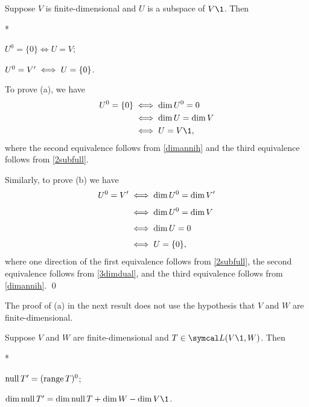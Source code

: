 {Suppose $V$ is finite-dimensional and $U$ is a subspace of $V\1$. Then
\begin{subtheorem}*
\item
$U^0 = \{0\} \iff U = V$;
\item
$U^0 = V' \iff U = \{0\}$.
\end{subtheorem}}

\proof
To prove (a), we have
\begin{align*}
U^0 = \br{0} &\iff \dim U^0 = 0 \\
&\iff \dim U = \dim V \\
&\iff U = V\1,
\end{align*}
where the second equivalence follows from \ref{dimannih} and the third equivalence follows from \ref{2subfull}.

Similarly, to prove (b) we have
\begin{align*}
U^0 = V' &\iff \dim U^0 = \dim V' \\[4bp]
&\iff \dim U^0 = \dim V \\[4bp]
&\iff \dim U = 0\\[4bp]
&\iff U = \{0\},
\end{align*}
where one direction of the first equivalence follows from \ref{2subfull}, the second equivalence follows from \ref{3dimdual}, and the third equivalence follows from \ref{dimannih}.
\qed

The proof of (a) in the next result does not use the hypothesis that $V$ and $W$ are finite-dimensional.

{Suppose $V$ and $W$ are finite-dimensional and $T \in \L(V\1, W)$. Then
\begin{subtheorem}*
\item
$\operatorname{null} T' = (\operatorname{range} T)^0$;
\item
$\dim \ker T' = \dim \ker T + \dim W - \dim V\1$.
\end{subtheorem}}

